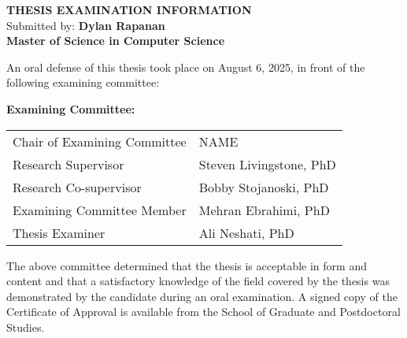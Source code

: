 \begin{center}
    \textbf{\Large THESIS EXAMINATION INFORMATION}\\
    Submitted by: \textbf{Dylan Rapanan}\\[1em]
    \textbf{Master of Science in Computer Science}\\[2em]
\end{center}

\begin{center}
\end{center}
\vspace{2em}

An oral defense of this thesis took place on August 6, 2025, in front of the following examining committee:

\vspace{1em}

\noindent
\textbf{Examining Committee:}

\vspace{1em}

\begin{tabular}{>{\raggedright}p{2.8in}p{3in}}
Chair of Examining Committee & NAME \\
Research Supervisor & Steven Livingstone, PhD \\
Research Co-supervisor & Bobby Stojanoski, PhD \\
Examining Committee Member & Mehran Ebrahimi, PhD \\
Thesis Examiner & Ali Neshati, PhD \\
\end{tabular}

\vspace{2em}

\noindent
The above committee determined that the thesis is acceptable in form and content and that a satisfactory knowledge of the field covered by the thesis was demonstrated by the candidate during an oral examination. A signed copy of the Certificate of Approval is available from the School of Graduate and Postdoctoral Studies.
\newpage